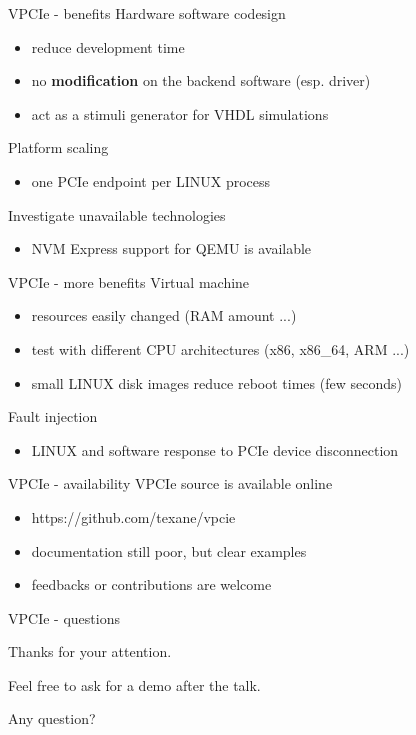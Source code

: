 \documentclass{beamer}
\begin{document}
\begin{frame}{VPCIe - benefits}
  Hardware software codesign
  \begin{itemize}
  \item reduce development time
  \item no \textbf{modification} on the backend software (esp. driver)
  \item act as a stimuli generator for VHDL simulations
  \end{itemize}

  Platform scaling
  \begin{itemize}
  \item one PCIe endpoint per LINUX process
  \end{itemize}

  Investigate unavailable technologies
  \begin{itemize}
  \item NVM Express support for QEMU is available
  \end{itemize}
\end{frame}

\begin{frame}{VPCIe - more benefits}
  Virtual machine
  \begin{itemize}
  \item resources easily changed (RAM amount ...)
  \item test with different CPU architectures (x86, x86\_64, ARM ...)
  \item small LINUX disk images reduce reboot times (few seconds)
  \end{itemize}
  Fault injection
  \begin{itemize}
  \item LINUX and software response to PCIe device disconnection
  \end{itemize}
\end{frame}

\begin{frame}{VPCIe - availability}
  VPCIe source is available online
  \begin{itemize}
  \item https://github.com/texane/vpcie
  \item documentation still poor, but clear examples
  \item feedbacks or contributions are welcome
  \end{itemize}
\end{frame}

\begin{frame}{VPCIe - questions}
  \begin{center} Thanks for your attention. \end{center}
  \begin{center} Feel free to ask for a demo after the talk. \end{center}
  \begin{center} Any question? \end{center}
\end{frame}
\end{document}
